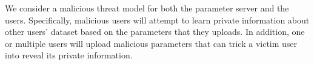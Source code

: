 \documentclass[conference]{IEEEtran}
\begin{document}

We consider a malicious threat model for both the parameter server and the users. Specifically, malicious users will
attempt to learn private information about other users' dataset based on the parameters that they uploads.  In
addition, one or multiple  users will upload malicious parameters that can trick a victim user into reveal its private information. 

  




\end{document}
